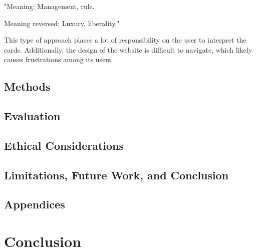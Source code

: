 \documentclass[10pt,twocolumn]{article}
\begin{document}
    "Meaning: Management, rule.
    
    Meaning reversed: Luxury, liberality."
    
    This type of approach places a lot of responsibility on the user to interpret the cards. Additionally, the design of the website is difficult to navigate, which likely causes frustrations among its users.

    
\subsection
{Methods}
\subsection{Evaluation}

\subsection{Ethical Considerations}

\subsection{Limitations, Future Work, and Conclusion}

\subsection{Appendices}

\section{Conclusion}

\printbibliography 
\end{document}
